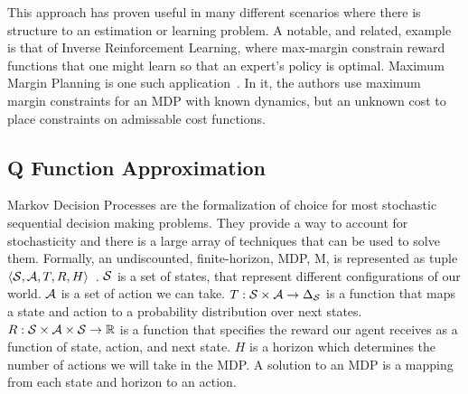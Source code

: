This approach has proven useful in many different scenarios where there is structure to an estimation or learning problem.
A notable, and related, example is that of Inverse Reinforcement Learning, where max-margin constrain reward functions that one might learn so that an expert's policy is optimal.
Maximum Margin Planning is one such application~\cite{Ratliff_ICML06}. 
In it, the authors use maximum margin constraints for an MDP with known dynamics, but an unknown cost to place constraints on admissable cost functions.


\subsection{Q Function Approximation}
Markov Decision Processes are the formalization of choice for most stochastic sequential decision making problems.
They provide a way to account for stochasticity and there is a large array of techniques that can be used to solve them.
Formally, an undiscounted, finite-horizon, MDP, M, is represented as tuple $\langle\mathcal{S},\mathcal{A},T,R, H\rangle$~\cite{puterman1994}.
$\mathcal{S}{}$ is a set of states, that represent different configurations of our world.
$\mathcal{A}{}$ is a set of action we can take.
$T:\mathcal{S}{} \times \mathcal{A}{} \rightarrow \Delta_{\mathcal{S}{}}$ is a function that maps a state and action to a probability distribution over next states.
$R:\mathcal{S}{}\times \mathcal{A}{} \times \mathcal{S}{} \rightarrow \mathbb{R}$ is a function that specifies the reward our agent receives as a function of state, action, and next state.
$H$ is a horizon which determines the number of actions we will take in the MDP.
A solution to an MDP is a mapping from each state and horizon to an action.

